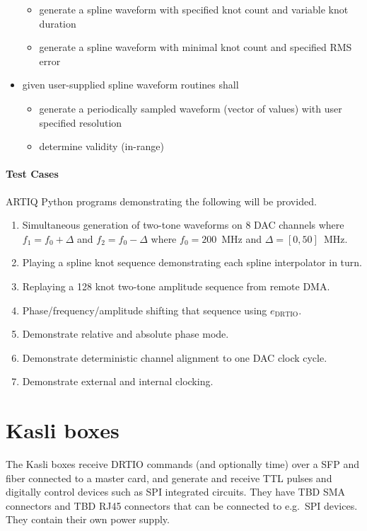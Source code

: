 \documentclass[11pt]{paper}
\begin{document}
\begin{itemize}
\begin{itemize}
		\item generate a spline waveform with specified knot count and variable knot duration 
		\item generate a spline waveform with minimal knot count and specified RMS error
	\end{itemize}
	\item given user-supplied spline waveform routines shall
	\begin{itemize}
		\item generate a periodically sampled waveform (vector of values) with user specified resolution
		\item determine validity (in-range)
	\end{itemize}

\end{itemize}

\paragraph{Test Cases}

ARTIQ Python programs demonstrating the following will be provided.

\begin{enumerate}
	\item Simultaneous generation of two-tone waveforms on 8 DAC channels where $f_{1}=f_{0}+\Delta$ and $f_{2}=f_{0}-\Delta$ where $f_{0}=200$~MHz and $\Delta=[0,50]$~MHz.
	\item Playing a spline knot sequence demonstrating each spline interpolator in
		turn.
	\item Replaying a 128 knot two-tone amplitude sequence from remote DMA.
	\item Phase/frequency/amplitude shifting that sequence using $e_\mathrm{DRTIO}$.
	\item Demonstrate relative and absolute phase mode.
	\item Demonstrate deterministic channel alignment to one DAC clock cycle.
	\item Demonstrate external and internal clocking.
\end{enumerate}

\section{Kasli boxes}
The Kasli boxes receive DRTIO commands (and optionally time) over a SFP and fiber connected to a master card, and generate and receive TTL pulses and digitally control devices such as SPI integrated circuits. They have TBD SMA connectors and TBD RJ45 connectors that can be connected to e.g.\ SPI devices. They contain their own power supply.
\end{document}
